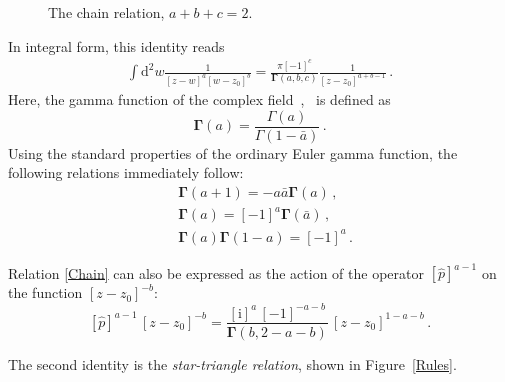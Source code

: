 \documentclass[a4paper,11pt]{article}
\renewcommand{\imath}{\mathrm{i}}
\numberwithin{equation}{section}
\begin{document}
\begin{figure}[H]
    \centering
    \caption{The chain relation, $a+b+c=2$.}
    \label{Rules1}
\end{figure}

In integral form, this identity reads
\begin{align}\label{Chain}
    \int \mathrm{d}^2 w \frac{1}{[z-w]^a [w-z_0]^{b}} =
    \frac{\pi [-1]^c}{\mathbf{\Gamma}(a,b,c)}
    \frac{1}{[z-z_0]^{a+b-1}} \,.
\end{align}
Here, the gamma function of the complex field~\cite[Section~1.4]{GGR},~\cite[Section~1.3]{N} is defined as
\begin{equation*}
    \bm{\Gamma}(a) = \frac{\Gamma(a)}{\Gamma(1-\bar{a})} \,.
\end{equation*}
Using the standard properties of the ordinary Euler gamma function, the following relations immediately follow:
\begin{align}\label{gamma-diff}
    & \bm{\Gamma}(a + 1) = - a \bar{a} \bm{\Gamma}(a) \,, \\
    & \bm{\Gamma}(a) = [-1]^{a} \bm{\Gamma}(\bar{a}) \,, \\ \label{gamma-refl}
    & \bm{\Gamma}(a) \bm{\Gamma}(1-a) = [-1]^a \,.
\end{align}

Relation \eqref{Chain} can also be expressed as the action of the operator $[\hat{p}]^{a-1}$ on the function $[z-z_0]^{-b}$:
\begin{equation}\nonumber
    [\hat{p}]^{a-1}\,[z-z_0]^{-b} =
    \frac{[\imath]^{a}\,[-1]^{-a-b}}{\mathbf{\Gamma}(b,2-a-b)}\,
    [z-z_0]^{1-a-b} \,.
\end{equation}

The second identity is the \textit{star-triangle relation}, shown in Figure~\ref{Rules}.
\end{document}
